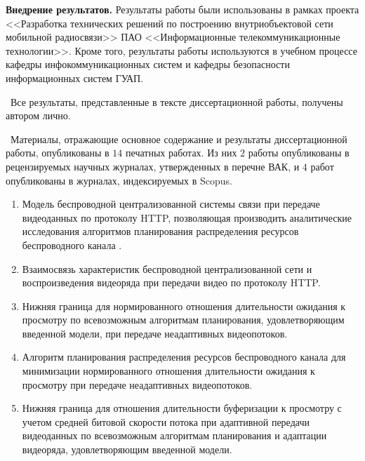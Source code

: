 \textbf{Внедрение результатов.} Результаты работы были использованы в рамках проекта <<Разработка технических решений по построению внутриобъектовой сети мобильной радиосвязи>> ПАО <<Информационные телекоммуникационные технологии>>. Кроме того, результаты работы используются в учебном процессе кафедры инфокоммуникационных систем и кафедры безопасности информационных систем ГУАП.

\contribution\ Все результаты, представленные в тексте диссертационной работы, получены автором лично.

\publications\ Материалы, отражающие основное содержание и результаты диссертационной работы, опубликованы в $14$ печатных работах. Из них $2$ работы опубликованы в рецензируемых научных журналах, утвержденных в перечне ВАК, и $4$ работ опубликованы в журналах, индексируемых в Scopus.

\begin{enumerate}
    \item Модель беспроводной централизованной системы связи при передаче видеоданных по протоколу HTTP, позволяющая производить аналитические исследования алгоритмов планирования распределения ресурсов беспроводного канала .
    \item Взаимосвязь характеристик беспроводной централизованной сети и воспроизведения видеоряда при передачи видео по протоколу HTTP.
    \item Нижняя граница для нормированного отношения длительности ожидания к просмотру по всевозможным алгоритмам планирования, удовлетворяющим введенной модели, при передаче неадаптивных видеопотоков.
    \item Алгоритм планирования распределения ресурсов беспроводного канала для минимизации нормированного отношения длительности ожидания к просмотру при передаче неадаптивных видеопотоков.
    \item Нижняя граница для отношения длительности буферизации к просмотру с учетом средней битовой скорости потока при адаптивной передачи видеоданных по всевозможным алгоритмам планирования и адаптации видеоряда, удовлетворяющим введенной модели.
\end{enumerate}
